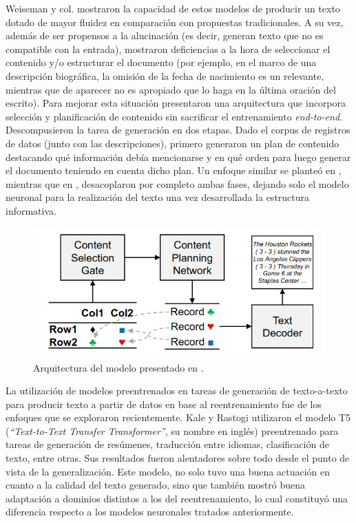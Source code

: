  Weiseman y col.  mostraron la capacidad de estos modelos de producir un texto dotado de mayor 
fluidez en comparación con propuestas tradicionales. A su vez, además de ser propensos a la alucinación (es decir, generan texto que no es compatible con la entrada), 
mostraron  deficiencias a la hora de seleccionar el contenido y/o estructurar el documento (por ejemplo, en el marco de una descripción biográfica, la omisión de la fecha de nacimiento es un relevante, 
mientras que de aparecer no es apropiado que lo haga en la última oración del escrito). Para mejorar esta situación   
presentaron una arquitectura que incorpora selección y planificación de contenido sin sacrificar el entrenamiento \emph{end-to-end}. Descompusieron la tarea de generación en dos etapas. Dado el corpus de 
registros de datos (junto con las descripciones), primero generaron un plan de contenido destacando qué información debía mencionarse y en qué orden para luego generar el documento teniendo en 
cuenta dicho plan. Un enfoque similar se planteó en , mientras que en , desacoplaron por completo ambas fases, dejando solo el modelo neuronal para la realización del 
texto una vez desarrollada la estructura informativa.

        \begin{figure}[!]
            \begin{center}
                \includegraphics[scale=0.4]{Graphics/lapata_arquitectura.png}
            \end{center}
            \caption{Arquitectura del modelo presentado en .}
            \label{fig_lapata_arquitectura}
        \end{figure}


    La utilización de modelos preentrenados en tareas de generación de texto-a-texto para producir texto a partir de datos en base al reentrenamiento 
fue de los enfoques que se exploraron recientemente. Kale y Rastogi  utilizaron el modelo T5 (\emph{“Text-to-Text Transfer Transformer”}, su nombre en inglés) 
preentrenado para tareas de generación de resúmenes, traducción entre idiomas, clasificación de texto, entre otras. Sus resultados fueron alentadores sobre todo desde el punto de vista de 
la generalización. Este modelo, no solo tuvo una buena actuación en cuanto a la calidad del texto generado, sino que también mostró buena adaptación a dominios distintos a los 
del reentrenamiento, lo cual constituyó una diferencia respecto a los modelos neuronales tratados anteriormente.


